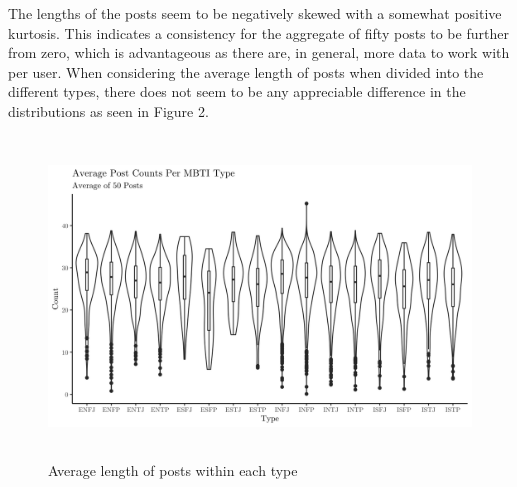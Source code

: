 \documentclass[11pt,a4paper]{article}
\begin{document}
	The lengths of the posts seem to be negatively skewed with a somewhat positive kurtosis. This indicates a consistency for the aggregate of fifty posts to be further from zero, which is advantageous as there are, in general, more data to work with per user. When considering the average length of posts when divided into the different types, there does not seem to be any appreciable difference in the distributions as seen in Figure 2.
	

	\begin{figure}[h!]
		\centering
		
		\includegraphics[height=8.5cm]{../output/visualisations/len_post_type}
		
		\caption{Average length of posts within each type}
		
	\end{figure}
	
\end{document}
